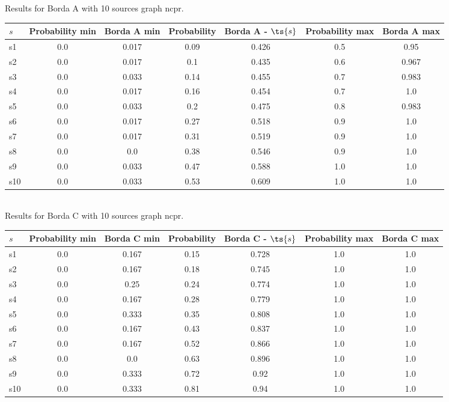 \documentclass{article}
\begin{document}
\noindent Results for Borda A with 10 sources graph ncpr.

\noindent\begin{tabular}{|l|c|c|c|c|c|c|}
\hline
$s$& Probability min & Borda A min & Probability & Borda A - $\ts{s}$ & Probability max & Borda A max\\
\hline
s1 &0.0 & 0.017 & 0.09 & 0.426 & 0.5 & 0.95\\
\hline
s2 &0.0 & 0.017 & 0.1 & 0.435 & 0.6 & 0.967\\
\hline
s3 &0.0 & 0.033 & 0.14 & 0.455 & 0.7 & 0.983\\
\hline
s4 &0.0 & 0.017 & 0.16 & 0.454 & 0.7 & 1.0\\
\hline
s5 &0.0 & 0.033 & 0.2 & 0.475 & 0.8 & 0.983\\
\hline
s6 &0.0 & 0.017 & 0.27 & 0.518 & 0.9 & 1.0\\
\hline
s7 &0.0 & 0.017 & 0.31 & 0.519 & 0.9 & 1.0\\
\hline
s8 &0.0 & 0.0 & 0.38 & 0.546 & 0.9 & 1.0\\
\hline
s9 &0.0 & 0.033 & 0.47 & 0.588 & 1.0 & 1.0\\
\hline
s10 &0.0 & 0.033 & 0.53 & 0.609 & 1.0 & 1.0\\
\hline
\end{tabular}\\

\noindent Results for Borda C with 10 sources graph ncpr.

\noindent\begin{tabular}{|l|c|c|c|c|c|c|}
\hline
$s$& Probability min & Borda C min & Probability & Borda C - $\ts{s}$ & Probability max & Borda C max\\
\hline
s1 &0.0 & 0.167 & 0.15 & 0.728 & 1.0 & 1.0\\
\hline
s2 &0.0 & 0.167 & 0.18 & 0.745 & 1.0 & 1.0\\
\hline
s3 &0.0 & 0.25 & 0.24 & 0.774 & 1.0 & 1.0\\
\hline
s4 &0.0 & 0.167 & 0.28 & 0.779 & 1.0 & 1.0\\
\hline
s5 &0.0 & 0.333 & 0.35 & 0.808 & 1.0 & 1.0\\
\hline
s6 &0.0 & 0.167 & 0.43 & 0.837 & 1.0 & 1.0\\
\hline
s7 &0.0 & 0.167 & 0.52 & 0.866 & 1.0 & 1.0\\
\hline
s8 &0.0 & 0.0 & 0.63 & 0.896 & 1.0 & 1.0\\
\hline
s9 &0.0 & 0.333 & 0.72 & 0.92 & 1.0 & 1.0\\
\hline
s10 &0.0 & 0.333 & 0.81 & 0.94 & 1.0 & 1.0\\
\hline
\end{tabular}\\
\end{document}
